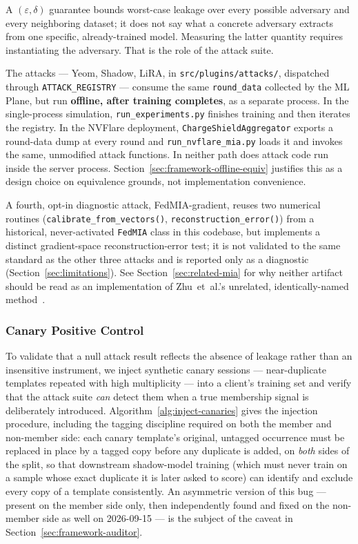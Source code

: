 A $(\varepsilon,\delta)$ guarantee bounds worst-case leakage over every
possible adversary and every neighboring dataset; it does not say what
a concrete adversary extracts from one specific, already-trained
model. Measuring the latter quantity requires instantiating the
adversary. That is the role of the attack suite.

The attacks --- Yeom, Shadow, LiRA, in \texttt{src/plugins/attacks/},
dispatched through \texttt{ATTACK\_REGISTRY} --- consume the same
\texttt{round\_data} collected by the ML Plane, but run
\textbf{offline, after training completes}, as a separate process. In
the single-process simulation, \texttt{run\_experiments.py} finishes
training and then iterates the registry. In the NVFlare deployment,
\texttt{ChargeShieldAggregator} exports a round-data dump at every
round and \texttt{run\_nvflare\_mia.py} loads it and invokes the same,
unmodified attack functions. In neither path does attack code run
inside the server process. Section~\ref{sec:framework-offline-equiv}
justifies this as a design choice on equivalence grounds, not
implementation convenience.

A fourth, opt-in diagnostic attack, FedMIA-gradient, reuses two
numerical routines (\texttt{calibrate\_from\_vectors()},
\texttt{reconstruction\_error()}) from a historical, never-activated
\texttt{FedMIA} class in this codebase, but implements a distinct
gradient-space reconstruction-error test; it is not validated to the
same standard as the other three attacks and is reported only as a
diagnostic (Section~\ref{sec:limitations}). See
Section~\ref{sec:related-mia} for why neither artifact should be read
as an implementation of Zhu~et~al.'s unrelated, identically-named
method~\cite{zhu2025fedmia}.

\subsubsection{Canary Positive Control}
\label{sec:framework-canary}

To validate that a null attack result reflects the absence of leakage
rather than an insensitive instrument, we inject synthetic canary
sessions --- near-duplicate templates repeated with high multiplicity
--- into a client's training set and verify that the attack suite
\emph{can} detect them when a true membership signal is deliberately
introduced. Algorithm~\ref{alg:inject-canaries} gives the injection
procedure, including the tagging discipline required on both the
member and non-member side: each canary template's original,
untagged occurrence must be replaced in place by a tagged copy before
any duplicate is added, on \emph{both} sides of the split, so that
downstream shadow-model training (which must never train on a sample
whose exact duplicate it is later asked to score) can identify and
exclude every copy of a template consistently. An asymmetric version of
this bug --- present on the member side only, then independently found
and fixed on the non-member side as well on 2026-09-15 --- is the
subject of the caveat in Section~\ref{sec:framework-auditor}.


